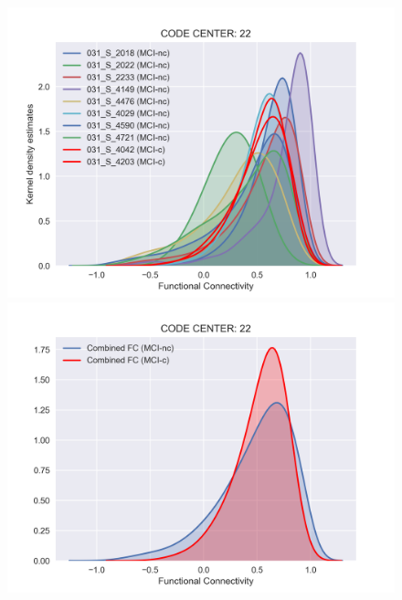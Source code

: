 \documentclass[a4paper,12pt]{elsarticle}  %
\begin{document}
		\begin{figure}[h]
		\centering
			\begin{minipage}{.5\textwidth}
				\centering
				\includegraphics[width=1\linewidth]{fig_distFC_individual_centre_22.png}
			\end{minipage}%
			\begin{minipage}{.5\textwidth}
				\centering
				\includegraphics[width=1\linewidth]{fig_distFC_mitjana_centre_22.png}
			\end{minipage}
			\begin{minipage}{.5\textwidth}

\end{minipage}
\end{figure}
\end{document}

